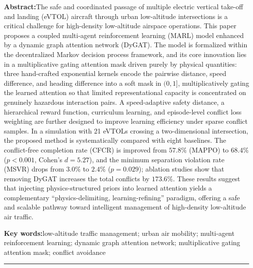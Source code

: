 \documentclass[12pt,a4paper,UTF8]{ctexart}
\begin{document}
\vspace{10pt}
\noindent\textbf{Abstract:}\enspace The safe and coordinated passage of multiple electric vertical take-off and landing (eVTOL) aircraft through urban low-altitude intersections is a critical challenge for high-density low-altitude airspace operations. This paper proposes a coupled multi-agent reinforcement learning (MARL) model enhanced by a dynamic graph attention network (DyGAT). The model is formalized within the decentralized Markov decision process framework, and its core innovation lies in a multiplicative gating attention mask driven purely by physical quantities: three hand-crafted exponential kernels encode the pairwise distance, speed difference, and heading difference into a soft mask in $(0,1]$, multiplicatively gating the learned attention so that limited representational capacity is concentrated on genuinely hazardous interaction pairs. A speed-adaptive safety distance, a hierarchical reward function, curriculum learning, and episode-level conflict loss weighting are further designed to improve learning efficiency under sparse conflict samples. In a simulation with 21 eVTOLs crossing a two-dimensional intersection, the proposed method is systematically compared with eight baselines. The conflict-free completion rate (CFCR) is improved from $57.8\%$ (MAPPO) to $68.4\%$ ($p<0.001$, Cohen's $d=5.27$), and the minimum separation violation rate (MSVR) drops from $3.0\%$ to $2.4\%$ ($p=0.029$); ablation studies show that removing DyGAT increases the total conflicts by $173.6\%$. These results suggest that injecting physics-structured priors into learned attention yields a complementary ``physics-delimiting, learning-refining'' paradigm, offering a safe and scalable pathway toward intelligent management of high-density low-altitude air traffic.

\vspace{6pt}
\noindent\textbf{Key words:}\enspace low-altitude traffic management; urban air mobility; multi-agent reinforcement learning; dynamic graph attention network; multiplicative gating attention mask; conflict avoidance

\vspace{12pt}
\hrule
\vspace{12pt}

\end{document}
